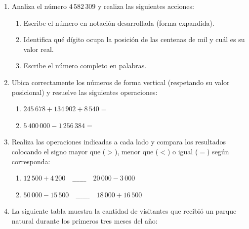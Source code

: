 \documentclass[12pt, letterpaper]{article}
\newif\ifmostrarrespuestas
\newcommand{\respuesta}[1]{%
	\ifmostrarrespuestas
	\par\vspace{0.2cm}%
	\begin{tcolorbox}[
		enhanced,
		colback=valred!5,         %
		colframe=valred,          %
		arc=2mm,                  %
		boxrule=1pt,              %
		title={\small\bfseries\ding{51} Solución / Procedimiento},
		coltitle=white,           %
		boxed title style={colback=valred, arc=1mm}, %
		top=3mm, bottom=3mm, left=3mm, right=3mm %
		]
		#1
	\end{tcolorbox}%
	\par\vspace{0.1cm}%
	\fi
}
\begin{document}
	\begin{enumerate}[itemsep=0.8cm]
		
		\item Analiza el número $4\,582\,309$ y realiza las siguientes acciones:
		\begin{enumerate}[label=\alph*., itemsep=0.2cm, topsep=0.2cm]
			\item Escribe el número en notación desarrollada (forma expandida).
			\item Identifica qué dígito ocupa la posición de las centenas de mil y cuál es su valor real.
			\item Escribe el número completo en palabras.
		\end{enumerate}
		
		\respuesta{$4000000+500000+80000+2000+300+0+9$}
		
		\item Ubica correctamente los números de forma vertical (respetando su valor posicional) y resuelve las siguientes operaciones:
		\begin{enumerate}[label=\alph*., itemsep=0.2cm, topsep=0.2cm]
			\item $245\,678 + 134\,902 + 8\,540 = $
			\item $5\,400\,000 - 1\,256\,384 = $
		\end{enumerate}
		\respuesta{\begin{enumerate}
				\item 389120
				\item 4143620 
				\end{enumerate}
		}
		
		\item Realiza las operaciones indicadas a cada lado y compara los resultados colocando el signo mayor que ($>$), menor que ($<$) o igual ($=$) según corresponda:
		\begin{enumerate}[label=\alph*., itemsep=0.2cm, topsep=0.2cm]
			\item $12\,500 + 4\,200 \quad \_\_\_\_\_\_ \quad 20\,000 - 3\,000$
			\item $50\,000 - 15\,500 \quad \_\_\_\_\_\_ \quad 18\,000 + 16\,500$
		\end{enumerate}
		\respuesta{
			\begin{enumerate}
				\item $16700<17000$
				\item $34500=34500$ 
			\end{enumerate}
		}
		
		\item La siguiente tabla muestra la cantidad de visitantes que recibió un parque natural durante los primeros tres meses del año:
		

\end{enumerate}
\end{document}

